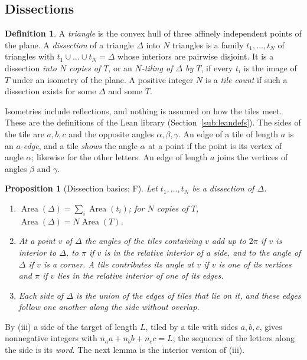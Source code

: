 \documentclass[11pt,reqno]{amsart}
\theoremstyle{plain}
\newtheorem{proposition}[theorem]{Proposition}
\theoremstyle{definition}
\newtheorem{definition}[theorem]{Definition}
\DeclareMathOperator{\Area}{Area}
\newcommand{\sF}{\textup{\textsf{F}}}
\begin{document}
\subsection{Dissections}

\begin{definition}\label{def:tiling}
A \emph{triangle} is the convex hull of three affinely independent points of the plane. A \emph{dissection}
of a triangle $\Delta$ into $N$ triangles is a family $t_1,\dots,t_N$ of triangles with
$t_1\cup\dots\cup t_N=\Delta$ whose interiors are pairwise disjoint. It is a dissection \emph{into $N$
copies of $T$}, or an \emph{$N$-tiling of $\Delta$ by $T$}, if every $t_i$ is the image of $T$ under an
isometry of the plane. A positive integer $N$ is a \emph{tile count} if such a dissection exists for some
$\Delta$ and some $T$.
\end{definition}

Isometries include reflections, and nothing is assumed on how the tiles meet. These are the definitions of
the Lean library (Section~\ref{sub:leandefs}). The sides of the tile are $a,b,c$ and the opposite angles
$\alpha,\beta,\gamma$. An edge of a tile of length $a$ is an \emph{$a$-edge}, and a tile \emph{shows} the
angle $\alpha$ at a point if the point is its vertex of angle $\alpha$; likewise for the other letters. An
edge of length $a$ joins the vertices of angles $\beta$ and $\gamma$.

\begin{proposition}[Dissection basics; \sF]\label{prop:basics}
Let $t_1,\dots,t_N$ be a dissection of $\Delta$.
\begin{enumerate}
\item[\textup{(i)}] $\Area(\Delta)=\sum_i\Area(t_i)$; for $N$ copies of $T$, $\Area(\Delta)=N\Area(T)$.
\item[\textup{(ii)}] At a point $v$ of $\Delta$ the angles of the tiles containing $v$ add up to $2\pi$ if
$v$ is interior to $\Delta$, to $\pi$ if $v$ is in the relative interior of a side, and to the angle of
$\Delta$ if $v$ is a corner. A tile contributes its angle at $v$ if $v$ is one of its vertices and $\pi$ if
$v$ lies in the relative interior of one of its edges.
\item[\textup{(iii)}] Each side of $\Delta$ is the union of the edges of tiles that lie on it, and these
edges follow one another along the side without overlap.
\end{enumerate}
\end{proposition}

By (iii) a side of the target of length $L$, tiled by a tile with sides $a,b,c$, gives nonnegative integers
with $n_a a+n_b b+n_c c=L$; the sequence of the letters along the side is its \emph{word}. The next lemma is
the interior version of (iii).
\end{document}
